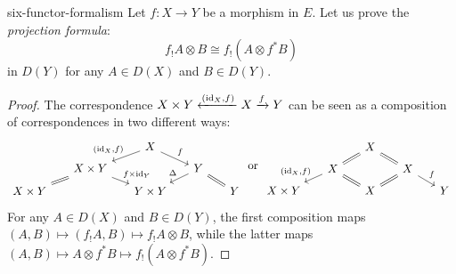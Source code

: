 \begin{example}{six-functor-formalism}
    Let $f : X \to Y$ be a morphism in $E$. Let us prove the \textit{projection formula}:
    \[ f_! A \otimes B \cong f_! (A \otimes f^* B) \]
    in $D(Y)$ for any $A \in D(X)$ and $B \in D(Y)$.
    \begin{proof}
        The correspondence $X \times Y \xleftarrow{(\textup{id}_X, f)} X \xrightarrow{f} Y$ can be seen as a composition of correspondences in two different ways:
        \[ \begin{tikzcd}[row sep=0.5em, column sep=1.5em] & & X \arrow[swap]{dl}{(\id_X, f)} \arrow{dr}{f} & & \\ & X \times Y \arrow[equals]{dl} \arrow{dr}{f \times \id_Y} & & Y \arrow[swap]{dl}{\Delta} \arrow[equals]{dr} & \\ X \times Y & & Y \times Y & & Y \end{tikzcd} \textup{ or } \begin{tikzcd}[row sep=0.5em, column sep=1.5em] & & X \arrow[equals]{dl} \arrow[equals]{dr} & & \\ & X \arrow[swap]{dl}{(\id_X, f)} \arrow[equals]{dr} & & X \arrow[equals]{dl} \arrow{dr}{f} & \\ X \times Y & & X & & Y \end{tikzcd} \]
        For any $A \in D(X)$ and $B \in D(Y)$, the first composition maps $(A, B) \mapsto (f_! A, B) \mapsto f_! A \otimes B$, while the latter maps $(A, B) \mapsto A \otimes f^* B \mapsto f_!(A \otimes f^* B)$.
    \end{proof}
\end{example}
